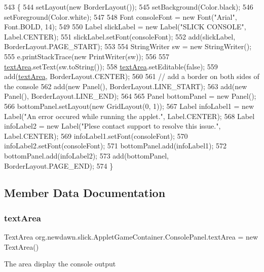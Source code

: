 \begin{DoxyCode}
543                                        \{
544          setLayout(\textcolor{keyword}{new} BorderLayout());
545          setBackground(Color.black);
546          setForeground(Color.white);
547          
548          Font consoleFont = \textcolor{keyword}{new} Font(\textcolor{stringliteral}{"Arial"}, Font.BOLD, 14);
549          
550          Label slickLabel = \textcolor{keyword}{new} Label(\textcolor{stringliteral}{"SLICK CONSOLE"}, Label.CENTER);
551          slickLabel.setFont(consoleFont);
552          add(slickLabel, BorderLayout.PAGE\_START);
553          
554          StringWriter sw = \textcolor{keyword}{new} StringWriter();
555          e.printStackTrace(\textcolor{keyword}{new} PrintWriter(sw));
556          
557          \mbox{\hyperlink{classorg_1_1newdawn_1_1slick_1_1_applet_game_container_1_1_console_panel_af71b345c0d2ac0773ca77f00e01d4af2}{textArea}}.setText(sw.toString());
558          \mbox{\hyperlink{classorg_1_1newdawn_1_1slick_1_1_applet_game_container_1_1_console_panel_af71b345c0d2ac0773ca77f00e01d4af2}{textArea}}.setEditable(\textcolor{keyword}{false});
559          add(\mbox{\hyperlink{classorg_1_1newdawn_1_1slick_1_1_applet_game_container_1_1_console_panel_af71b345c0d2ac0773ca77f00e01d4af2}{textArea}}, BorderLayout.CENTER);
560          
561          \textcolor{comment}{// add a border on both sides of the console}
562          add(\textcolor{keyword}{new} Panel(), BorderLayout.LINE\_START);
563          add(\textcolor{keyword}{new} Panel(), BorderLayout.LINE\_END);
564          
565          Panel bottomPanel = \textcolor{keyword}{new} Panel();
566          bottomPanel.setLayout(\textcolor{keyword}{new} GridLayout(0, 1));
567          Label infoLabel1 = \textcolor{keyword}{new} Label(\textcolor{stringliteral}{"An error occured while running the applet."}, Label.CENTER);
568          Label infoLabel2 = \textcolor{keyword}{new} Label(\textcolor{stringliteral}{"Plese contact support to resolve this issue."}, Label.CENTER);
569          infoLabel1.setFont(consoleFont);
570          infoLabel2.setFont(consoleFont);
571          bottomPanel.add(infoLabel1);
572          bottomPanel.add(infoLabel2);
573          add(bottomPanel, BorderLayout.PAGE\_END);
574       \}
\end{DoxyCode}


\subsection{Member Data Documentation}
\mbox{\label{classorg_1_1newdawn_1_1slick_1_1_applet_game_container_1_1_console_panel_af71b345c0d2ac0773ca77f00e01d4af2}} 
\subsubsection{\texorpdfstring{text\+Area}{textArea}}
{\footnotesize\ttfamily Text\+Area org.\+newdawn.\+slick.\+Applet\+Game\+Container.\+Console\+Panel.\+text\+Area = new Text\+Area()\hspace{0.3cm}{\ttfamily [package]}}

The area display the console output 